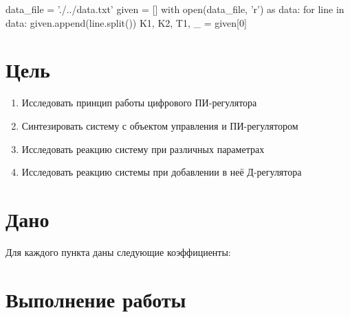 

\graphicspath{{./img/}}
\begin{pycode}
    data_file = './../data.txt'
    given = []
    with open(data_file, 'r') as data:
        for line in data:
            given.append(line.split())
    K1, K2, T1, _ = given[0]
\end{pycode}


    
    \setcounter{page}{2}
    
    \section{Цель}
        \begin{enumerate}
            \item Исследовать принцип работы цифрового ПИ-регулятора
            \item Синтезировать систему с объектом управления и ПИ-регулятором
            \item Исследовать реакцию систему при различных параметрах
            \item Исследовать реакцию системы при добавлении в неё Д-регулятора
        \end{enumerate}
        
    \section{Дано}
        Для каждого пункта даны следующие коэффициенты:
        \begin{center}
        \end{center}
    \section{Выполнение работы}
